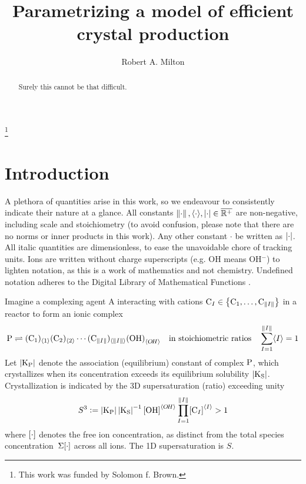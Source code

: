 \documentclass[a4paper]{base}
\newcommand{\stc}[1]{\M{\langle #1 \rangle}}
\begin{document}
    \title{Parametrizing a model of efficient crystal production}
    \author[R.A. Milton]{Robert A. Milton}
    \address{Department of Chemical, Materials and Biological Engineering, The University of Sheffield, Sheffield~S1~3JD, United Kingdom}
    \thanks{This work was funded by Solomon f. Brown.}
    \subjclass[2010]{}
    \begin{abstract}
        Surely this cannot be that difficult.
    \end{abstract}
    \maketitle


\section{Introduction}\label{sec:intro}
    A plethora of quantities arise in this work, so we endeavour to consistently indicate their nature at a glance.
    All constants $\norm{\cdot},\stc{\cdot},\mds{\cdot}\in\overline{\mathbb{R}^{+}}$ are non-negative, including scale \norm{\cdot} and stoichiometry \stc{\cdot}  (to avoid confusion, please note that there are no norms or inner products in this work). Any other constant $\cdot$ be written as $\left\lvert{\cdot}\right\rvert$.
    All italic quantities are dimensionless, to ease the unavoidable chore of tracking units.
    Ions are written without charge superscripts (e.g. OH means OH$^{-}$) to lighten notation, as this is a work of mathematics and not chemistry.
    Undefined notation adheres to the Digital Library of Mathematical Functions \cite{NIST:DLMF}.

    Imagine a complexing agent A interacting with cations $\dn[I]{C} \in \set{\dn[1]{C},\ldots,\dn[\norm{I}]{C}}$ in a reactor to form an ionic complex
    \begin{equation*}
        \dn{P} \rightleftharpoons (\dn[1]{C})_{\stc{1}}(\dn[2]{C})_{\stc{2}}\cdots (\dn[\norm{I}]{C})_{\stc{\norm{I}}} \dn[\stc{O\!H}]{(OH)} \QT{in stoichiometric ratios}  \sum_{I=1}^{\norm{I}} \stc{I} = 1
    \end{equation*}
    Let $\mds{\dn{K_P}}$ denote the association (equilibrium) constant of complex $\dn{P}$,
    which crystallizes when its concentration exceeds its equilibrium solubility $\mds{\dn{K_{S}}}$.
    Crystallization is indicated by the 3D supersaturation (ratio) exceeding unity
    \begin{equation} \label{def:GE:S}
        S^{3} \deq \mds{\dn{K_{P}}}\mds{\dn{K_{S}}}^{-1} \cn{OH}^{\stc{O\!H}} \prod_{I=1}^{\norm{I}}\cn[I]{C}^{\stc{I}} > 1
    \end{equation}
    where $\cn{\cdot}$ denotes the free ion concentration, as distinct from the total species concentration $\tot{\cn{\cdot}}$ across all ions.
    The 1D supersaturation is $S$. 
\end{document}

